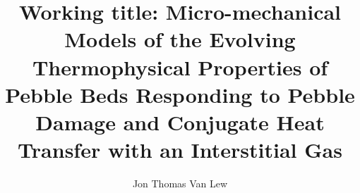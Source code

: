 \documentclass [prospectus, draft] {uclathes}
\title          {Working title: Micro-mechanical Models of the Evolving Thermophysical Properties of Pebble Beds Responding to Pebble Damage and Conjugate Heat Transfer with an Interstitial Gas}
\author         {Jon Thomas Van Lew}
\begin{document}
\makeintropages














\end{document}
